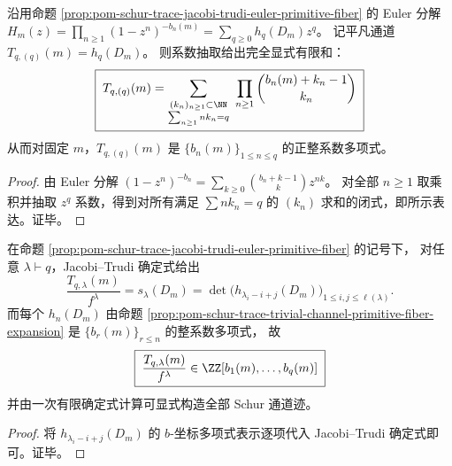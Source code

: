 \begin{proposition}\label{prop:pom-schur-trace-trivial-channel-primitive-fiber-expansion}
沿用命题 \ref{prop:pom-schur-trace-jacobi-trudi-euler-primitive-fiber} 的 Euler 分解
\(
H_m(z)=\prod_{n\ge 1}(1-z^n)^{-b_n(m)}=\sum_{q\ge 0}h_q(D_m)z^q
\)。
记平凡通道 \(T_{q,(q)}(m)=h_q(D_m)\)。
则系数抽取给出完全显式有限和：
\[
\boxed{\;
T_{q,(q)}(m)=
\sum_{\substack{(k_n)_{n\ge 1}\subset\NN\\ \sum_{n\ge 1}n k_n=q}}
\ \prod_{n\ge 1}\binom{b_n(m)+k_n-1}{k_n}\;}
\]
从而对固定 \(m\)，\(T_{q,(q)}(m)\) 是 \(\{b_n(m)\}_{1\le n\le q}\) 的正整系数多项式。
\end{proposition}
\begin{proof}
由 Euler 分解
\(
(1-z^n)^{-b_n}=\sum_{k\ge 0}\binom{b_n+k-1}{k}z^{nk}
\)。
对全部 \(n\ge 1\) 取乘积并抽取 \(z^q\) 系数，得到对所有满足 \(\sum n k_n=q\) 的 \((k_n)\) 求和的闭式，即所示表达。证毕。
\end{proof}

\begin{corollary}\label{cor:pom-schur-trace-all-channels-primitive-fiber-coordinate}
在命题 \ref{prop:pom-schur-trace-jacobi-trudi-euler-primitive-fiber} 的记号下，
对任意 \(\lambda\vdash q\)，Jacobi--Trudi 确定式给出
\[
\frac{T_{q,\lambda}(m)}{f^\lambda}
=s_\lambda(D_m)
=\det\bigl(h_{\lambda_i-i+j}(D_m)\bigr)_{1\le i,j\le \ell(\lambda)}.
\]
而每个 \(h_n(D_m)\) 由命题 \ref{prop:pom-schur-trace-trivial-channel-primitive-fiber-expansion} 是 \(\{b_r(m)\}_{r\le n}\) 的整系数多项式，
故
\[
\boxed{\;
\frac{T_{q,\lambda}(m)}{f^\lambda}\in \ZZ[b_1(m),\dots,b_q(m)]\;}
\]
并由一次有限确定式计算可显式构造全部 Schur 通道迹。
\end{corollary}
\begin{proof}
将 \(h_{\lambda_i-i+j}(D_m)\) 的 \(b\)-坐标多项式表示逐项代入 Jacobi--Trudi 确定式即可。证毕。
\end{proof}
